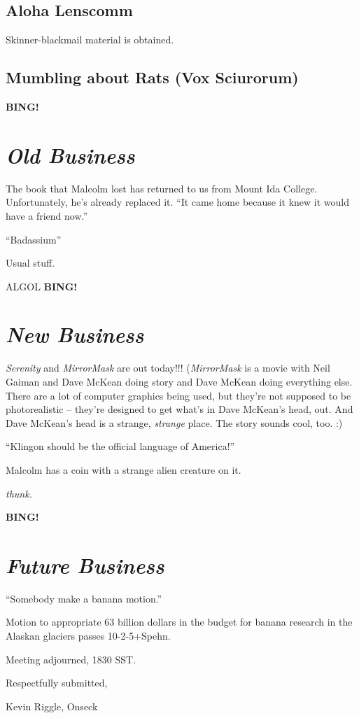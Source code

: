 \documentclass[10pt]{article}
\newcommand{\bing}{{\bf BING!} }
\newcommand{\goto}[1]{\bing \vskip 12pt \section*{{\em{#1}}}}
\begin{document}
\subsection*{Aloha Lenscomm}
Skinner-blackmail material is obtained.

\subsection*{Mumbling about Rats (Vox Sciurorum)}

\goto{Old Business}
The book that Malcolm lost has returned to us from Mount Ida College.  Unfortunately, he's
already replaced it.  ``It came home because it knew it would have a friend now.''

``Badassium''

Usual stuff.

ALGOL
\goto{New Business}
\emph{Serenity} and \emph{MirrorMask} are out today!!!  (\emph{MirrorMask} is a movie with 
Neil Gaiman and Dave McKean doing story and Dave McKean doing everything else.  There are a lot
of computer graphics being used, but they're not supposed to be photorealistic -- they're designed
to get what's in Dave McKean's head, out.  And Dave McKean's head is a strange, \emph{strange}
place.  The story sounds cool, too. :)

``Klingon should be the official language of America!''

Malcolm has a coin with a strange alien creature on it.

\emph{thunk.}

\goto{Future Business}
``Somebody make a banana motion.''

Motion to appropriate 63 billion dollars in the budget for banana research in the Alaskan glaciers
passes 10-2-5+Spehn.

\vspace{12pt}

\noindent
Meeting adjourned, 1830 SST.

\vspace{18pt}

\centerline{Respectfully submitted,}
\centerline{Kevin Riggle, Onseck}
\end{document}
